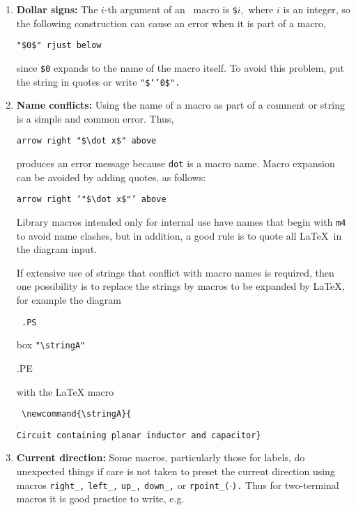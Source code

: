 \begin{enumerate}
{\tt "`inverse'".}

\noindent The cure is to add single quotes.

  The only subtlety required in writing
  \Mfour\ macros is deciding when to quote arguments.  In the context
  of circuits it seemed best to assume that macro arguments would not
  be protected by quotes at the level of macro invocation, but should
  be quoted inside each macro.  There may be cases where this rule is
  not optimal or where the quotes could be omitted.

\item 
{\bf Dollar signs:}
The $i$-th argument of an \Mfour\ macro is {\tt \$}$i,$ where $i$ is
an integer, so the following construction can cause an error when it
is part of a macro,

{\tt "\$0\$" rjust below}

\noindent since {\tt \$0} expands to the name of the macro itself.
To avoid this problem, put the string in quotes or write {\tt "\$`'0\$".}

\item 
{\bf Name conflicts:}  Using the name of a macro as part of
a comment or string is a simple and common error.
Thus,

{\tt arrow right \verb|"$\dot x$"| above}

\noindent produces an error message because {\tt dot} is a macro
name.   Macro expansion can be avoided by adding quotes, as follows:

{\tt arrow right `\verb|"$\dot x$"|' above}

Library macros intended only for internal use have names that begin
with {\tt m4} to avoid name clashes, but in addition, a good rule is to
quote all \LaTeX\ in the diagram input.

If extensive use of strings
that conflict with macro names is required, then one possibility is
to replace the strings by macros to be expanded by \LaTeX, for example
the diagram

{\tt
.PS

   \hspace*{\parindent} box \verb|"\stringA"|

.PE
}

\noindent with the LaTeX macro

{\tt
  \verb|\newcommand{\stringA}{|%

   \verb|Circuit containing planar inductor and capacitor}|
}

\item 
{\bf Current direction:} Some macros, particularly those for labels, do
unexpected things if care is not taken to preset the current direction
using macros {\tt right\_,} {\tt left\_,} {\tt up\_,} {\tt down\_,}
or {\tt rpoint\_($\cdot$).}
Thus for two-terminal macros it is good practice to write, e.g.


\end{enumerate}
